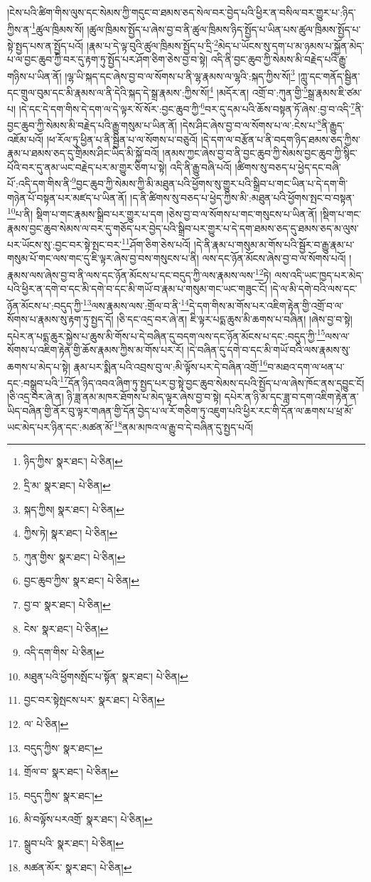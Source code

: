 །ངེས་པའི་ཚིག་གིས་ལུས་དང་སེམས་ཀྱི་གདུང་བ་ཐམས་ཅད་སེལ་བར་བྱེད་པའི་ཕྱིར་ན་བསིལ་བར་གྱུར་པ་:ཉིད་ཀྱིས་ན་\footnote{ཉིད་ཀྱིས་  སྣར་ཐང་།  པེ་ཅིན། }ཚུལ་ཁྲིམས་སོ། །ཚུལ་ཁྲིམས་སྤྱོད་པ་ཞེས་བྱ་བ་ནི་ཚུལ་ཁྲིམས་ཉིད་སྤྱོད་པ་ཡིན་པས་ཚུལ་ཁྲིམས་སྤྱོད་པ་སྟེ་སྤྱད་པས་ན་སྤྱོད་པའོ། །རྣམ་པ་དེ་ལྟ་བུའི་ཚུལ་ཁྲིམས་སྤྱོད་པ་དྲི་\footnote{དྲི་མ་  སྣར་ཐང་།  པེ་ཅིན། }མེད་པ་ཡོངས་སུ་དག་པ་མ་ཉམས་པ་སྐྱོན་མེད་པ་ལ་བྱང་ཆུབ་ཀྱི་བར་དུ་རྟག་ཏུ་སྤྱོད་པར་ཤོག་ཅིག་ཅེས་བྱ་བ་སྟེ། འདི་ནི་བྱང་ཆུབ་ཀྱི་སེམས་མི་བརྗེད་པའི་རྒྱུ་གཉིས་པ་ཡིན་ནོ། །ལྷ་ཡི་སྐད་དང་ཞེས་བྱ་བ་ལ་སོགས་པ་ནི་ལྷ་རྣམས་ལ་ལྷའི་:སྐད་ཀྱིས་སོ།\footnote{སྐད་ཀྱིས།  སྣར་ཐང་།  པེ་ཅིན། } །ཀླུ་དང་གནོད་སྦྱིན་དང་གྲུལ་བུམ་དང་མི་རྣམས་ལ་ནི་དེའི་སྐད་དེ་སྒྲ་རྣམས་:ཀྱིས་སོ།\footnote{ཀྱིས་ཏེ།  སྣར་ཐང་།  པེ་ཅིན། } །མདོར་ན། འགྲོ་བ་:ཀུན་གྱི་\footnote{ཀུན་གྱིས་  སྣར་ཐང་།  པེ་ཅིན། }སྒྲ་རྣམས་ཇི་ཙམ་པ། །དེ་དང་དེ་དག་གིས་དེ་དག་ལ་དེ་ལྟར་སོ་སོར་:བྱང་ཆུབ་ཀྱི་\footnote{བྱང་ཆུབ་ཀྱིས་  སྣར་ཐང་།  པེ་ཅིན། }བར་དུ་དམ་པའི་ཆོས་བསྟན་ཏོ་ཞེས་:བྱ་བ་འདི་\footnote{བྱ་བ་  སྣར་ཐང་།  པེ་ཅིན། }ནི་བྱང་ཆུབ་ཀྱི་སེམས་མི་བརྗེད་པའི་རྒྱུ་གསུམ་པ་ཡིན་ནོ། །དེས་ཤིང་ཞེས་བྱ་བ་ལ་སོགས་པ་ལ་:ངེས་པ་\footnote{ངེས་  སྣར་ཐང་།  པེ་ཅིན། }ནི་རྒྱུད་འཇོམ་པའོ། །ཕ་རོལ་ཏུ་ཕྱིན་པ་ནི་སྦྱིན་པ་ལ་སོགས་པ་བཅུའོ། །དེ་དག་ལ་བརྩོན་པ་ནི་བདག་ཉིད་ཐམས་ཅད་ཀྱིས་རྣམ་པ་ཐམས་ཅད་དུ་གྲིམས་ཤིང་ཡིད་མི་སྐྱོ་བའོ། །ནམས་ཀྱང་ཞེས་བྱ་བ་ནི་བྱང་ཆུབ་ཀྱི་སེམས་བྱང་ཆུབ་ཀྱི་སྙིང་པོའི་བར་དུ་ནམ་ཡང་བརྗེད་པར་མ་གྱུར་ཅིག་པ་སྟེ། འདི་ནི་རྒྱུ་བཞི་པའོ། །ཚིགས་སུ་བཅད་པ་ཕྱེད་དང་བཞི་པོ་:འདི་དག་གིས་ནི་\footnote{འདི་དག་གིས་  པེ་ཅིན། }བྱང་ཆུབ་ཀྱི་སེམས་ཀྱི་མི་མཐུན་པའི་ཕྱོགས་སུ་གྱུར་པའི་སྒྲིབ་པ་གང་ཡིན་པ་དེ་དག་གི་གཉེན་པོ་བསྟན་པར་མཛད་པ་ཡིན་ནོ། །ད་ནི་ཚིགས་སུ་བཅད་པ་ཕྱེད་ཀྱིས་མི་:མཐུན་པའི་ཕྱོགས་སྤང་བ་བསྟན་\footnote{མཐུན་པའི་ཕྱོགསསྤོང་པ་སྟོན་  སྣར་ཐང་།  པེ་ཅིན། }པ་ནི། སྡིག་པ་གང་རྣམས་སྒྲིབ་པར་གྱུར་པ་དག །ཅེས་བྱ་བ་ལ་སོགས་པ་གང་གསུངས་པ་ཡིན་ནོ། །སྡིག་པ་གང་རྣམས་བྱང་ཆུབ་སེམས་ལ་བར་དུ་གཅོད་པར་བྱེད་པའི་སྒྲིབ་པར་གྱུར་པ་དེ་དག་ཐམས་ཅད་དུ་ཐམས་ཅད་མ་ལུས་པར་ཡོངས་སུ་:བྱང་བར་སྟེ་སྤང་བར་\footnote{བྱང་བར་སྟེསྤངས་པར་  སྣར་ཐང་།  པེ་ཅིན། }ཤོག་ཅིག་ཅེས་པའོ། །དེ་ནི་རྣམ་པ་གསུམ་མ་གོས་པའི་སྦྱོར་བ་རྒྱུ་རྣམ་པ་གསུམ་པོ་གང་ལས་གང་དུ་ཇི་ལྟར་ཞེས་བྱ་བས་གསུངས་པ་ནི། ལས་དང་ཉོན་མོངས་ཞེས་བྱ་བ་ལ་སོགས་པའོ། །རྣམས་ལས་ཞེས་བྱ་བ་ནི་ལས་དང་ཉོན་མོངས་པ་དང་བདུད་ཀྱི་ལས་རྣམས་ལས་\footnote{ལ་  པེ་ཅིན། }ཏེ། ལས་འདི་ཡང་ཁྱད་པར་མེད་པའི་ཕྱིར་ན་དགེ་བ་དང་མི་དགེ་བ་དང་མི་གཡོ་བ་རྣམ་པ་གསུམ་གང་ཡང་གཟུང་ངོ། །དེ་ལ་མི་དགེ་བའི་ལས་དང་ཉོན་མོངས་པ་:བདུད་ཀྱི་\footnote{བདུད་ཀྱིས་  སྣར་ཐང་། }ལས་རྣམས་ལས་:གྲོལ་བ་ནི་\footnote{གྲོལ་བ་  སྣར་ཐང་།  པེ་ཅིན། }དེ་དག་གིས་མ་གོས་པར་འཇིག་རྟེན་གྱི་འགྲོ་བ་ལ་སོགས་པ་རྣམས་སུ་རྟག་ཏུ་སྤྱད་དོ། །ཅི་དང་འདྲ་བར་ཞེ་ན། ཇི་ལྟར་པདྨ་ཆུས་མི་ཆགས་པ་བཞིན། །ཞེས་བྱ་བ་སྟེ། དཔེར་ན་པདྨ་ཆུར་སྐྱེས་པ་ཆུས་མི་གོས་པ་དེ་བཞིན་དུ་བདག་ལས་དང་ཉོན་མོངས་པ་དང་:བདུད་ཀྱི་\footnote{བདུད་ཀྱིས་  སྣར་ཐང་། }ལས་ལ་སོགས་པ་འཇིག་རྟེན་གྱི་ཆོས་རྣམས་ཀྱིས་མ་གོས་པར་རོ། །དེ་བཞིན་དུ་དགེ་བ་དང་མི་གཡོ་བའི་ལས་རྣམས་སུ་ཆགས་པ་མེད་པ་སྟེ། རྣམ་པར་སྨིན་པའི་འབྲས་བུ་ལ་:མི་ལྟོས་པར་དེ་བཞིན་འགྲོ་\footnote{མི་བལྟོས་པརའགྲོ་  སྣར་ཐང་།  པེ་ཅིན། }བ་མཐའ་དག་ལ་ཕན་པ་དང་:བསྒྲུབ་པའི་\footnote{སྒྲུབ་པའི་  སྣར་ཐང་།  པེ་ཅིན། }དོན་ཉིད་འབའ་ཞིག་ཏུ་སྤྱད་པར་བྱ་སྟེ་བྱང་ཆུབ་སེམས་དཔའི་སྤྱོད་པ་ལ་ཞེས་ཁོང་ནས་དབྱུང་ངོ། །ཅི་འདྲ་བར་ཞེ་ན། ཉི་ཟླ་ནམ་མཁར་ཐོགས་པ་མེད་ལྟར་ཞེས་བྱ་བ་སྟེ། དཔེར་ན་ཉི་མ་དང་ཟླ་བ་དག་འཇིག་རྟེན་ན་ཡིད་བཞིན་གྱི་ནོར་བུ་ལྟར་གཞན་གྱི་དོན་བྱེད་པ་ལ་རོ་གཅིག་ཏུ་འཇུག་པའི་ཕྱིར་རང་གི་དོན་ལ་ཆགས་པ་ཕྲ་མོ་ཡང་མེད་པར་ཉིན་དང་:མཚན་མོ་\footnote{མཚན་མོར་  སྣར་ཐང་།  པེ་ཅིན། }ནམ་མཁའ་ལ་རྒྱུ་བ་དེ་བཞིན་དུ་སྤྱད་པའོ། 
